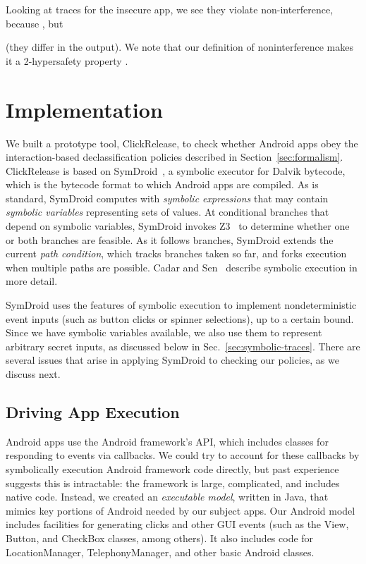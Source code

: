 \documentclass{llncs}
\newcommand{\code}[1]{\textsf{#1}} \newcommand{\bcode}[1]{\texttt{#1}}
\newcommand{\toolname}{ClickRelease\xspace}
\begin{document}
Looking at traces for the insecure app, we see
they violate non-interference, because
, but

(they differ in the output).  We note that our definition of
noninterference makes it a 2-hypersafety property \cite{Clarkson:10,Clarkson:2014}.

\section{Implementation}
\label{sec:implementation}

We built a prototype tool, \toolname{}, to check whether Android apps obey the
interaction-based declassification policies described in
Section~\ref{sec:formalism}. \toolname{} is based on
SymDroid~\cite{Jeon:2012}, a symbolic executor for Dalvik bytecode,
which is the bytecode format to which Android apps are compiled.
As is standard, SymDroid computes with \emph{symbolic
  expressions} that may contain \emph{symbolic variables}
representing sets of values. At conditional branches that depend on
symbolic variables, SymDroid invokes Z3~\cite{deMoura:2008} to
determine whether one or both branches are feasible. As it follows
branches, SymDroid extends the current \emph{path condition}, which tracks
branches taken so far, and forks execution when multiple paths are
possible. Cadar and Sen~\cite{Cadar:13} describe
symbolic execution in more detail.

SymDroid uses the features of symbolic execution to implement
nondeterministic event inputs (such as button clicks or spinner
selections), up to a certain bound. Since we have symbolic variables
available, we also use them to represent arbitrary secret inputs, as
discussed below in Sec.~\ref{sec:symbolic-traces}. There are several issues that arise in applying SymDroid
to checking our policies, as we discuss next.

\subsection{Driving App Execution}
\label{sec:driver}

Android apps use the Android framework's API, which includes
classes for responding to events via callbacks. We could try to
account for these callbacks by symbolically execution Android framework code
directly, but past experience suggests this is intractable: the
framework is large, complicated, and includes native code.
Instead, we created an \emph{executable model}, written in Java, that
mimics key portions of Android needed by our subject apps. Our Android
model includes facilities for generating clicks and
other GUI events (such as the \code{View}, \code{Button}, and
\code{CheckBox} classes, among others). It also includes code for
\code{LocationManager},
\code{TelephonyManager}, and other basic Android classes.
\end{document}
